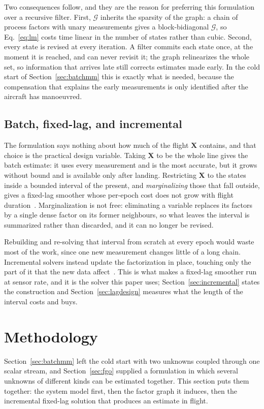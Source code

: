 \documentclass{IEEEtaes}
\begin{document}
Two consequences follow, and they are the reason for preferring this formulation
over a recursive filter. First, $\mathcal{G}$ inherits the sparsity of the graph:
a chain of process factors with unary measurements gives a block-bidiagonal
$\mathcal{G}$, so Eq.~\eqref{eq:lm} costs time linear in the number of states rather
than cubic. Second, every state is revised at every iteration. A filter commits
each state once, at the moment it is reached, and can never revisit it; the graph
relinearizes the whole set, so information that arrives late still corrects
estimates made early. In the cold start of Section~\ref{sec:batchmm} this is
exactly what is needed, because the compensation that explains the early
measurements is only identified after the aircraft has manoeuvred.

\subsection{Batch, fixed-lag, and incremental}
The formulation says nothing about how much of the flight $\mathbf{X}$ contains,
and that choice is the practical design variable. Taking $\mathbf{X}$ to be the
whole line gives the batch estimate: it uses every measurement and is the most
accurate, but it grows without bound and is available only after landing.
Restricting $\mathbf{X}$ to the states inside a bounded interval of the present,
and \emph{marginalizing} those that fall outside, gives a fixed-lag smoother
whose per-epoch cost does not grow with flight
duration~\cite{indelman2013,kaess2012}. Marginalization is not free: eliminating
a variable replaces its factors by a single dense factor on its former
neighbours, so what leaves the interval is summarized rather than discarded, and
it can no longer be revised.

Rebuilding and re-solving that interval from scratch at every epoch would waste
most of the work, since one new measurement changes little of a long chain.
Incremental solvers instead update the factorization in place, touching only the
part of it that the new data affect~\cite{kaess2012}. This is what makes a
fixed-lag smoother run at sensor rate, and it is the solver this paper uses;
Section~\ref{sec:incremental} states the construction and
Section~\ref{sec:lagdesign} measures what the length of the interval costs and
buys.

\section{Methodology}\label{sec:method}
Section~\ref{sec:batchmm} left the cold start with two unknowns coupled through
one scalar stream, and Section~\ref{sec:fgo} supplied a formulation in which
several unknowns of different kinds can be estimated together. This section puts
them together: the system model first, then the factor graph it induces, then
the incremental fixed-lag solution that produces an estimate in flight.
\end{document}

